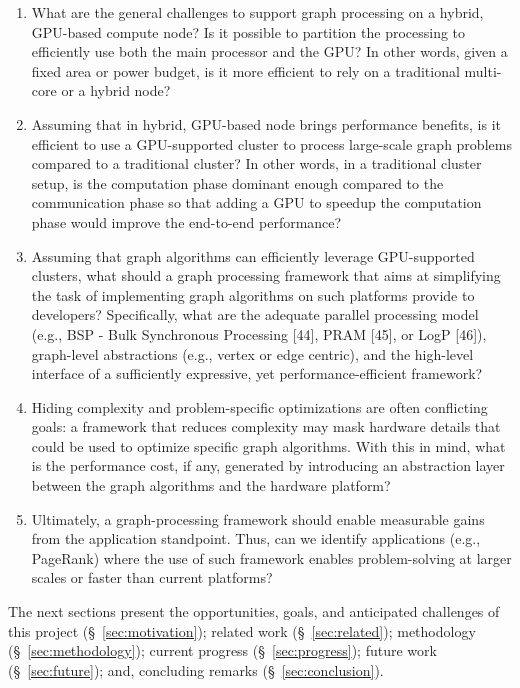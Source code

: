 \begin{enumerate}
\item What are the general challenges to support graph processing on a hybrid, GPU-based compute node? Is it possible to partition the processing to efficiently use both the main processor and the GPU? In other words, given a fixed area or power budget, is it more efficient to rely on a traditional multi-core or a hybrid node?

\item Assuming that in hybrid, GPU-based node brings performance benefits, is it efficient to use a GPU-supported cluster to process large-scale graph problems compared to a traditional cluster? In other words, in a traditional cluster setup, is the computation phase dominant enough compared to the communication phase so that adding a GPU to speedup the computation phase would improve the end-to-end performance?

\item Assuming that graph algorithms can efficiently leverage GPU-supported clusters, what should a graph processing framework that aims at simplifying the task of implementing graph algorithms on such platforms provide to developers? Specifically, what are the adequate parallel processing model (e.g., BSP - Bulk Synchronous Processing [44], PRAM [45], or LogP [46]), graph-level abstractions (e.g., vertex or edge centric), and the high-level interface of a sufficiently expressive, yet performance-efficient framework?

\item Hiding complexity and problem-specific optimizations are often conflicting goals: a framework that reduces complexity may mask hardware details that could be used to optimize specific graph algorithms. With this in mind, what is the performance cost, if any, generated by introducing an abstraction layer between the graph algorithms and the hardware platform?

\item Ultimately, a graph-processing framework should enable measurable gains from the application standpoint. Thus, can we identify applications (e.g., PageRank) where the use of such framework enables problem-solving at larger scales or faster than current platforms?

\end{enumerate}

The next sections present the opportunities, goals, and anticipated challenges of this project (\S~\ref{sec:motivation}); related work (\S~\ref{sec:related}); methodology (\S~\ref{sec:methodology}); current progress (\S~\ref{sec:progress}); future work (\S~\ref{sec:future}); and, concluding remarks (\S ~\ref{sec:conclusion}).

